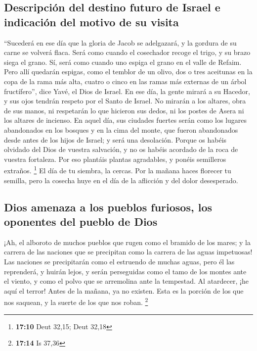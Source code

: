 \begin{paracol}{2}
\hypertarget{descripciuxf3n-del-destino-futuro-de-israel-e-indicaciuxf3n-del-motivo-de-su-visita}{%
\subsection{Descripción del destino futuro de Israel e indicación del
motivo de su
visita}\label{descripciuxf3n-del-destino-futuro-de-israel-e-indicaciuxf3n-del-motivo-de-su-visita}}

 ``Sucederá en ese día que la gloria de Jacob se
adelgazará, y la gordura de su carne se volverá flaca. 
Será como cuando el cosechador recoge el trigo, y su brazo siega el
grano. Sí, será como cuando uno espiga el grano en el valle de Refaim.
 Pero allí quedarán espigas, como el temblor de un olivo,
dos o tres aceitunas en la copa de la rama más alta, cuatro o cinco en
las ramas más externas de un árbol fructífero'', dice Yavé, el Dios de
Israel.  En ese día, la gente mirará a su Hacedor, y sus
ojos tendrán respeto por el Santo de Israel.  No mirarán a
los altares, obra de sus manos, ni respetarán lo que hicieron sus dedos,
ni los postes de Asera ni los altares de incienso.  En
aquel día, sus ciudades fuertes serán como los lugares abandonados en
los bosques y en la cima del monte, que fueron abandonados desde antes
de los hijos de Israel; y será una desolación.  Porque os
habéis olvidado del Dios de vuestra salvación, y no os habéis acordado
de la roca de vuestra fortaleza. Por eso plantáis plantas agradables, y
ponéis semilleros extraños. \footnote{\textbf{17:10} Deut 32,15; Deut
  32,18}  El día de tu siembra, la cercas. Por la mañana
haces florecer tu semilla, pero la cosecha huye en el día de la
aflicción y del dolor desesperado.

\hypertarget{dios-amenaza-a-los-pueblos-furiosos-los-oponentes-del-pueblo-de-dios}{%
\subsection{Dios amenaza a los pueblos furiosos, los oponentes del
pueblo de
Dios}\label{dios-amenaza-a-los-pueblos-furiosos-los-oponentes-del-pueblo-de-dios}}

 ¡Ah, el alboroto de muchos pueblos que rugen como el
bramido de los mares; y la carrera de las naciones que se precipitan
como la carrera de las aguas impetuosas!  Las naciones se
precipitarán como el estruendo de muchas aguas, pero él las reprenderá,
y huirán lejos, y serán perseguidas como el tamo de los montes ante el
viento, y como el polvo que se arremolina ante la tempestad.
 Al atardecer, ¡he aquí el terror! Antes de la mañana, ya
no existen. Esta es la porción de los que nos saquean, y la suerte de
los que nos roban. \footnote{\textbf{17:14} Is 37,36}


\end{paracol}
